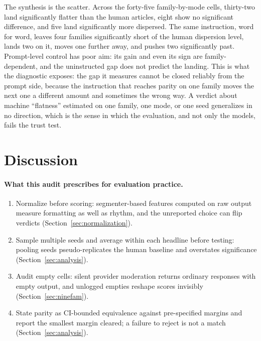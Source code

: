 \documentclass{article}
\begin{document}
The synthesis is the scatter. Across the forty-five family-by-mode cells, thirty-two land
significantly flatter than the human articles, eight show no significant difference, and five
land significantly more dispersed. The same instruction, word for word, leaves four families
significantly short of the human dispersion level, lands two on it, moves one further away, and
pushes two significantly past. Prompt-level control has poor aim: its gain and even its sign are
family-dependent, and the uninstructed gap does not predict the landing. This is what the
diagnostic exposes: the gap it measures cannot be closed reliably from the prompt side, because
the instruction that reaches parity on one family moves the next one a different amount and
sometimes the wrong way.
A verdict about machine ``flatness'' estimated on one family, one mode, or one seed generalizes in no direction, which is the sense in which the evaluation, and not only the models, fails the trust test.

\section{Discussion}\label{sec:discussion}

\paragraph{What this audit prescribes for evaluation practice.}
\begin{enumerate}
\item Normalize before scoring: segmenter-based features computed on raw output measure formatting as well as rhythm, and the unreported choice can flip verdicts (Section~\ref{sec:normalization}).
\item Sample multiple seeds and average within each headline before testing: pooling seeds pseudo-replicates the human baseline and overstates significance (Section~\ref{sec:analysis}).
\item Audit empty cells: silent provider moderation returns ordinary responses with empty output, and unlogged empties reshape scores invisibly (Section~\ref{sec:ninefam}).
\item State parity as CI-bounded equivalence against pre-specified margins and report the smallest margin cleared; a failure to reject is not a match (Section~\ref{sec:analysis}).
\end{enumerate}
\end{document}
